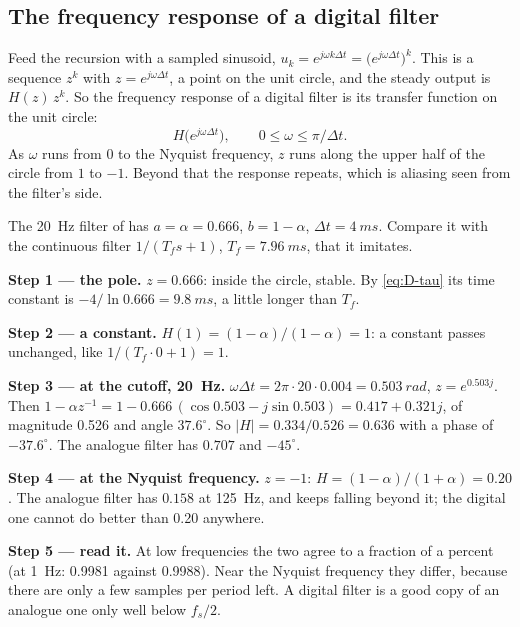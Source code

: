 \subsection{The frequency response of a digital filter}
Feed the recursion with a sampled sinusoid, $u_k = e^{j\omega k\Delta t} = \big(e^{j\omega\Delta t}\big)^k$. This is a sequence $z^k$ with $z = e^{j\omega\Delta t}$, a point on the unit circle, and the steady output is $H(z)\,z^k$. So the frequency response of a digital filter is its transfer function on the unit circle:
\begin{equation}\label{eq:D-freq}
  H\big(e^{j\omega\Delta t}\big), \qquad 0 \le \omega \le \pi/\Delta t .
\end{equation}
As $\omega$ runs from 0 to the Nyquist frequency, $z$ runs along the upper half of the circle from $1$ to $-1$. Beyond that the response repeats, which is aliasing seen from the filter's side.

\begin{example}
\label{ex:D-filter}
The \SI{20}{Hz} filter of  has $a = \alpha = 0.666$, $b = 1 - \alpha$, $\Delta t = \SI{4}{ms}$. Compare it with the continuous filter $1/(T_fs + 1)$, $T_f = \SI{7.96}{ms}$, that it imitates.

\textbf{Step 1 — the pole.} $z = 0.666$: inside the circle, stable. By \cref{eq:D-tau} its time constant is $-4/\ln 0.666 = \SI{9.8}{ms}$, a little longer than $T_f$.

\textbf{Step 2 — a constant.} $H(1) = (1 - \alpha)/(1 - \alpha) = 1$: a constant passes unchanged, like $1/(T_f \cdot 0 + 1) = 1$.

\textbf{Step 3 — at the cutoff, \SI{20}{Hz}.} $\omega\Delta t = 2\pi \cdot 20 \cdot 0.004 = \SI{0.503}{rad}$, $z = e^{0.503j}$. Then $1 - \alpha z^{-1} = 1 - 0.666\,(\cos 0.503 - j\sin 0.503) = 0.417 + 0.321j$, of magnitude 0.526 and angle $37.6^\circ$. So $|H| = 0.334/0.526 = 0.636$ with a phase of $-37.6^\circ$. The analogue filter has $0.707$ and $-45^\circ$.

\textbf{Step 4 — at the Nyquist frequency.} $z = -1$: $H = (1 - \alpha)/(1 + \alpha) = 0.20$. The analogue filter has $0.158$ at \SI{125}{Hz}, and keeps falling beyond it; the digital one cannot do better than 0.20 anywhere.

\textbf{Step 5 — read it.} At low frequencies the two agree to a fraction of a percent (at \SI{1}{Hz}: 0.9981 against 0.9988). Near the Nyquist frequency they differ, because there are only a few samples per period left. A digital filter is a good copy of an analogue one only well below $f_s/2$.
\end{example}

